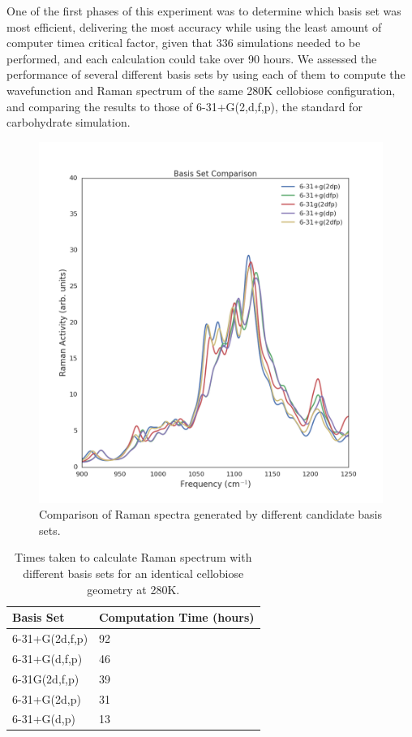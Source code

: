 One of the first phases of this experiment was to determine which basis set was most efficient, delivering the most accuracy while using the least amount of computer time\textemdash a critical factor, given that 336 simulations needed to be performed, and each calculation could take over 90 hours. We assessed the performance of several different basis sets by using each of them to compute the wavefunction and Raman spectrum of the same 280K cellobiose configuration, and comparing the results to those of 6-31+G(2,d,f,p), the standard for carbohydrate simulation.

\begin{figure}
\centering
\includegraphics[width=0.7\linewidth]{basis_set_comparison}
\caption{Comparison of Raman spectra generated by different candidate basis sets.}
\label{fig:basis_set_comparison}
\end{figure}

\begin{table}[]
	\centering
	\caption{Times taken to calculate Raman spectrum with different basis sets for an identical cellobiose geometry at 280K.}
	\label{tbl:basis_sets}
	\begin{tabular}{@{}ll@{}}
		\toprule
		Basis Set      & Computation Time (hours) \\ \midrule
		6-31+G(2d,f,p) & 92                       \\
		6-31+G(d,f,p)  & 46                       \\
		6-31G(2d,f,p)  & 39                       \\
		6-31+G(2d,p)   & 31                       \\
		6-31+G(d,p)    & 13                       \\ \bottomrule
	\end{tabular}
\end{table}

